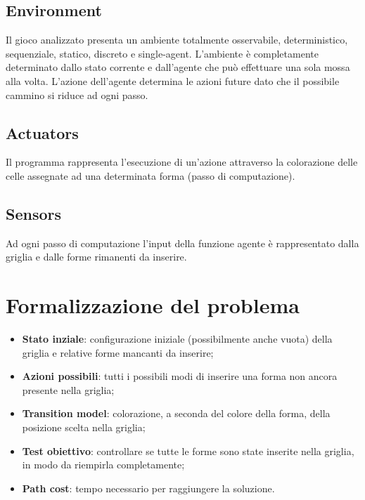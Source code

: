 \subsection{Environment}
Il gioco analizzato presenta un ambiente totalmente osservabile, deterministico, sequenziale, statico, discreto e single-agent.  L'ambiente è completamente determinato dallo stato corrente e dall'agente che può effettuare una sola mossa alla volta.
L'azione dell'agente determina le azioni future dato che il possibile cammino
si riduce ad ogni passo.

\subsection{Actuators}
Il programma rappresenta l'esecuzione di un'azione attraverso la colorazione delle celle assegnate ad una determinata forma (passo di computazione).

\subsection{Sensors}
Ad ogni passo di computazione l'input della funzione agente è rappresentato dalla griglia e dalle forme rimanenti da inserire.

\section{Formalizzazione del problema}
\begin{itemize}
	\item \textbf{Stato inziale}: configurazione iniziale (possibilmente anche vuota) della griglia e relative forme mancanti da inserire;
	\item \textbf{Azioni possibili}: tutti i possibili modi di inserire una forma non ancora presente nella griglia;
	\item \textbf{Transition model}: colorazione, a seconda del colore della forma, della posizione scelta nella griglia;
	\item \textbf{Test obiettivo}: controllare se tutte le forme sono state inserite nella griglia, in modo da riempirla completamente;
	\item \textbf{Path cost}: tempo necessario per raggiungere la soluzione.
					
\end{itemize}

